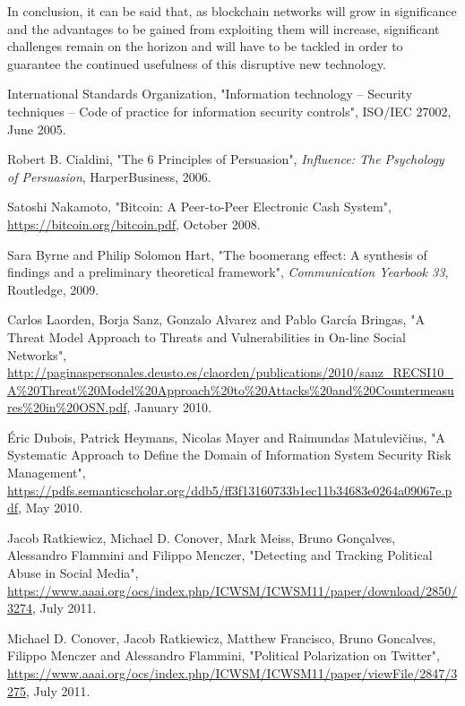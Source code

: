 \documentclass[12pt,a4paper]{article}
\begin{document}
In conclusion, it can be said that, as blockchain networks will grow in significance and the advantages to be gained from exploiting them will increase, significant challenges remain on the horizon and will have to be tackled in order to guarantee the continued usefulness of this disruptive new technology.\\

\newpage
\begin{thebibliography}{9}

International Standards Organization,
"Information technology -- Security techniques -- Code of practice for information security controls",
ISO/IEC 27002,
June 2005.

Robert B. Cialdini,
"The 6 Principles of Persuasion",
\textit{Influence: The Psychology of Persuasion},
HarperBusiness, 2006.

Satoshi Nakamoto,
"Bitcoin: A Peer-to-Peer Electronic Cash System",
\url{https://bitcoin.org/bitcoin.pdf},
October 2008.

Sara Byrne and Philip Solomon Hart,
"The boomerang effect: A synthesis of findings and a preliminary theoretical framework",
\textit{Communication Yearbook 33},
Routledge, 2009.

Carlos Laorden, Borja Sanz, Gonzalo Alvarez and Pablo García Bringas,
"A Threat Model Approach to Threats and Vulnerabilities in On-line Social Networks",
\url{http://paginaspersonales.deusto.es/claorden/publications/2010/sanz_RECSI10_A%20Threat%20Model%20Approach%20to%20Attacks%20and%20Countermeasures%20in%20OSN.pdf},
January 2010.

Éric Dubois, Patrick Heymans, Nicolas Mayer and Raimundas Matulevičius,
"A Systematic Approach to Define the Domain of Information System Security Risk Management",
\url{https://pdfs.semanticscholar.org/ddb5/ff3f13160733b1ec11b34683e0264a09067e.pdf},
May 2010.

Jacob Ratkiewicz, Michael D. Conover, Mark Meiss, Bruno Gonçalves, Alessandro Flammini and Filippo Menczer,
"Detecting and Tracking Political Abuse in Social Media",
\url{https://www.aaai.org/ocs/index.php/ICWSM/ICWSM11/paper/download/2850/3274},
July 2011.

Michael D. Conover, Jacob Ratkiewicz, Matthew Francisco, Bruno Goncalves, Filippo Menczer and Alessandro Flammini,
"Political Polarization on Twitter",
\url{https://www.aaai.org/ocs/index.php/ICWSM/ICWSM11/paper/viewFile/2847/3275},
July 2011.


\end{thebibliography}
\end{document}
